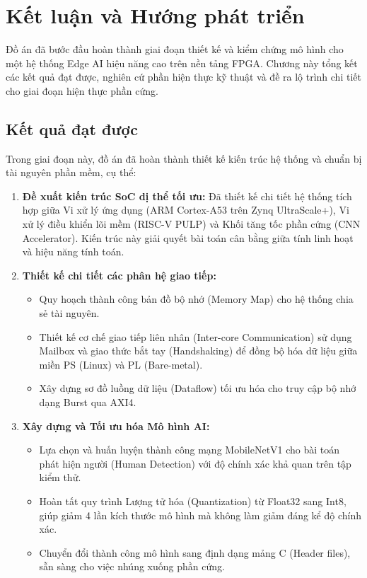 \chapter{Kết luận và Hướng phát triển}
\label{chap:conclusion}

Đồ án đã bước đầu hoàn thành giai đoạn thiết kế và kiểm chứng mô hình 
cho một hệ thống Edge AI hiệu năng cao trên nền tảng FPGA. 
Chương này tổng kết các kết quả đạt được, nghiên cứ phần hiện thực kỹ thuật 
và đề ra lộ trình chi tiết cho giai đoạn hiện thực phần cứng.

\section{Kết quả đạt được}
Trong giai đoạn này, đồ án đã hoàn thành thiết kế kiến trúc hệ thống và 
chuẩn bị tài nguyên phần mềm, cụ thể:

\begin{enumerate}
    \item \textbf{Đề xuất kiến trúc SoC dị thể tối ưu:} Đã thiết kế chi tiết hệ thống tích hợp giữa Vi xử lý ứng dụng (ARM Cortex-A53 trên Zynq UltraScale+), Vi xử lý điều khiển lõi mềm (RISC-V PULP) và Khối tăng tốc phần cứng (CNN Accelerator). Kiến trúc này giải quyết bài toán cân bằng giữa tính linh hoạt và hiệu năng tính toán.
    
    \item \textbf{Thiết kế chi tiết các phân hệ giao tiếp:}
    \begin{itemize}
        \item Quy hoạch thành công bản đồ bộ nhớ (Memory Map) cho hệ thống chia sẻ tài nguyên.
        \item Thiết kế cơ chế giao tiếp liên nhân (Inter-core Communication) sử dụng Mailbox và giao thức bắt tay (Handshaking) để đồng bộ hóa dữ liệu giữa miền PS (Linux) và PL (Bare-metal).
        \item Xây dựng sơ đồ luồng dữ liệu (Dataflow) tối ưu hóa cho truy cập bộ nhớ dạng Burst qua AXI4.
    \end{itemize}

    \item \textbf{Xây dựng và Tối ưu hóa Mô hình AI:}
    \begin{itemize}
        \item Lựa chọn và huấn luyện thành công mạng MobileNetV1 cho bài toán phát hiện người (Human Detection) với độ chính xác khả quan trên tập kiểm thử.
        \item Hoàn tất quy trình Lượng tử hóa (Quantization) từ Float32 sang Int8, giúp giảm 4 lần kích thước mô hình mà không làm giảm đáng kể độ chính xác.
        \item Chuyển đổi thành công mô hình sang định dạng mảng C (Header files), sẵn sàng cho việc nhúng xuống phần cứng.
    \end{itemize}
\end{enumerate}

